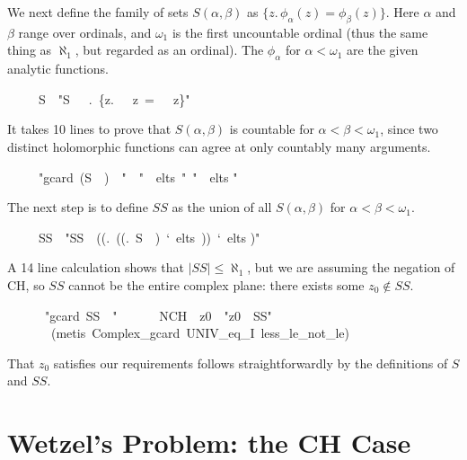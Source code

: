 \documentclass[runningheads]{llncs}
\begin{document}
\noindent
We next define the family of sets $S(\alpha,\beta)$ as  $\{z.\, \phi_\alpha (z) = \phi_\beta (z)\}$.
Here $\alpha$ and $\beta$ range over ordinals, and $\omega_1$ is the first uncountable ordinal (thus the same thing as $\aleph_1$, but regarded as an ordinal).
The $\phi_\alpha$ for $\alpha<\omega_1$ are the given analytic functions.
\begin{isabelle}
\ \ \ \ \ S\ \ "S\ \isasymequiv \ \isasymlambda \isasymalpha \ \isasymbeta .\ \{z.\ \isasymphi \ \isasymalpha \ z\ =\ \isasymphi \ \isasymbeta \ z\}"
\end{isabelle}

It takes 10 lines to prove that $S(\alpha,\beta)$ is countable for $\alpha<\beta<\omega_1$,
since two distinct holomorphic functions can agree at only countably many arguments.
\begin{isabelle}
\ \ \ \ \ "gcard\ (S\ \isasymalpha \ \isasymbeta )\ \isasymle \ "\ \ "\isasymalpha\ \isasymin\ elts\ \isasymbeta "\ "\isasymbeta\ \isasymin\ elts "\ \ \isasymalpha \ \isasymbeta
\end{isabelle}

The next step is to define $SS$ as the union of all $S(\alpha,\beta)$ for $\alpha<\beta<\omega_1$.
\begin{isabelle}
\ \ \ \ \ SS\ \ "SS\ \isasymequiv \ \isasymSqunion ((\isasymlambda \isasymbeta .\ \isasymSqunion ((\isasymlambda \isasymalpha .\ S\ \isasymalpha \ \isasymbeta )\ `\ elts\ \isasymbeta ))\ `\ elts )"
\end{isabelle}

A 14 line calculation shows that $|SS|\le\aleph_1$, but we are assuming the negation of CH, so $SS$ cannot be the entire complex plane: there exists some $z_0\not\in SS$.
\begin{isabelle}
\ \ \ \ \ \ "gcard\ SS\ \isasymle \ "\ \isanewline
\ \ \ \ \ NCH\ \ z0\ \ "z0\ \isasymnotin \ SS"\isanewline
\ \ \ \ \ \ \ (metis\ Complex\_gcard\ UNIV\_eq\_I\ less\_le\_not\_le)
\end{isabelle}

That $z_0$ satisfies our requirements follows straightforwardly by the definitions of $S$ and $SS$.

\section{Wetzel's Problem: the CH Case}
\end{document}
